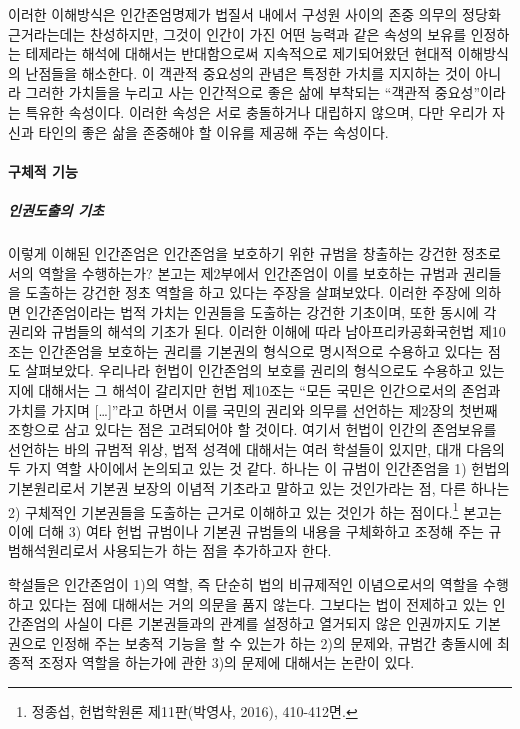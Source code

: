 이러한 이해방식은 인간존엄명제가 법질서 내에서 구성원 사이의 존중 의무의 정당화 근거라는데는 찬성하지만, 그것이 인간이 가진 어떤 능력과 같은 속성의 보유를 인정하는 테제라는 해석에 대해서는 반대함으로써 지속적으로 제기되어왔던 현대적 이해방식의 난점들을 해소한다. 이 객관적 중요성의 관념은 특정한 가치를 지지하는 것이 아니라 그러한 가치들을 누리고 사는 인간적으로 좋은 삶에 부착되는 ``객관적 중요성''이라는 특유한 속성이다. 이러한 속성은 서로 충돌하거나 대립하지 않으며, 다만 우리가 자신과 타인의 좋은 삶을 존중해야 할 이유를 제공해 주는 속성이다.

\paragraph{구체적 기능}

\subparagraph{인권도출의 기초}

이렇게 이해된 인간존엄은 인간존엄을 보호하기 위한 규범을 창출하는 강건한 정초로서의 역할을 수행하는가? 본고는 제2부에서 인간존엄이 이를 보호하는 규범과 권리들을 도출하는 강건한 정초 역할을 하고 있다는 주장을 살펴보았다. 이러한 주장에 의하면 인간존엄이라는 법적 가치는 인권들을 도출하는 강건한 기초이며, 또한 동시에 각 권리와 규범들의 해석의 기초가 된다. 이러한 이해에 따라 남아프리카공화국헌법 제10조는 인간존엄을 보호하는 권리를 기본권의 형식으로 명시적으로 수용하고 있다는 점도 살펴보았다. 우리나라 헌법이 인간존엄의 보호를 권리의 형식으로도 수용하고 있는지에 대해서는 그 해석이 갈리지만 헌법 제10조는 ``모든 국민은 인간으로서의 존엄과 가치를 가지며 {[}\ldots{]}''라고 하면서 이를 국민의 권리와 의무를 선언하는 제2장의 첫번째 조항으로 삼고 있다는 점은 고려되어야 할 것이다. 여기서 헌법이 인간의 존엄보유를 선언하는 바의 규범적 위상, 법적 성격에 대해서는 여러 학설들이 있지만, 대개 다음의 두 가지 역할 사이에서 논의되고 있는 것 같다. 하나는 이 규범이 인간존엄을 1) 헌법의 기본원리로서 기본권 보장의 이념적 기초라고 말하고 있는 것인가라는 점, 다른 하나는 2) 구체적인 기본권들을 도출하는 근거로 이해하고 있는 것인가 하는 점이다.\footnote{정종섭, 헌법학원론 제11판(박영사, 2016), 410-412면.} 본고는 이에 더해 3) 여타 헌법 규범이나 기본권 규범들의 내용을 구체화하고 조정해 주는 규범해석원리로서 사용되는가 하는 점을 추가하고자 한다.

학설들은 인간존엄이 1)의 역할, 즉 단순히 법의 비규제적인 이념으로서의 역할을 수행하고 있다는 점에 대해서는 거의 의문을 품지 않는다. 그보다는 법이 전제하고 있는 인간존엄의 사실이 다른 기본권들과의 관계를 설정하고 열거되지 않은 인권까지도 기본권으로 인정해 주는 보충적 기능을 할 수 있는가 하는 2)의 문제와, 규범간 충돌시에 최종적 조정자 역할을 하는가에 관한 3)의 문제에 대해서는 논란이 있다.

